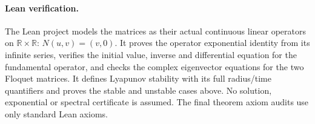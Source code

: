 \documentclass[11pt]{article}
\begin{document}
\paragraph{Lean verification.}\sloppy
The Lean project models the matrices as their actual continuous linear operators on $\mathbb R\times\mathbb R$: $N(u,v)=(v,0)$. It proves the operator exponential identity from its infinite series, verifies the initial value, inverse and differential equation for the fundamental operator, and checks the complex eigenvector equations for the two Floquet matrices. It defines Lyapunov stability with its full radius/time quantifiers and proves the stable and unstable cases above. No solution, exponential or spectral certificate is assumed. The final theorem axiom audits use only standard Lean axioms.
\end{document}
